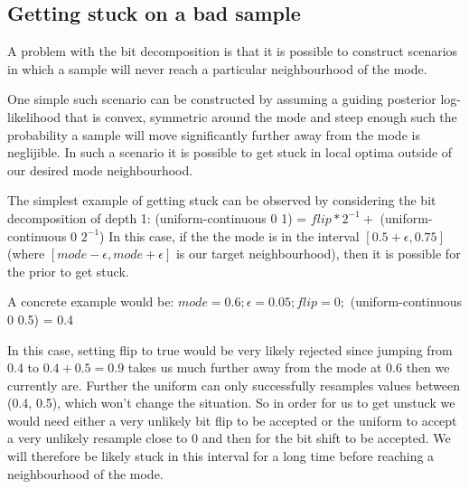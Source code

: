 \subsection{Getting stuck on a bad sample}
A problem with the bit decomposition is that it is possible to construct scenarios in which a sample will never reach a particular neighbourhood of the mode.

One simple such scenario can be constructed by assuming a guiding posterior log-likelihood that is convex, symmetric around the mode and steep enough such the probability a sample will move significantly further away from the mode is neglijible. In such a scenario it is possible to get stuck in local optima outside of our desired mode neighbourhood.

The simplest example of getting stuck can be observed by considering the bit decomposition of depth 1: 
(uniform-continuous 0 1) = $flip*2^{-1} +$ (uniform-continuous 0 $2^{-1}$) In this case, if the the mode is in the interval $[0.5 + \epsilon , 0.75]$ (where $[mode - \epsilon, mode + \epsilon]$ is our target neighbourhood), then it is possible for the prior to get stuck.
 
A concrete example would be:
$mode = 0.6;
\epsilon = 0.05;
flip = 0;$
(uniform-continuous 0 0.5) = 0.4

In this case, setting flip to true would be very likely rejected since jumping from 0.4 to $0.4 + 0.5 = 0.9$ takes us much further away from the mode at 0.6 then we currently are. Further the uniform can only successfully resamples values between (0.4, 0.5), which won't change the situation. So in order for us to get unstuck we would need either a very unlikely bit flip to be accepted or the uniform to accept a very unlikely resample close to 0 and then for the bit shift to be accepted. We will therefore be likely stuck in this interval for a long time before reaching a neighbourhood of the mode.

